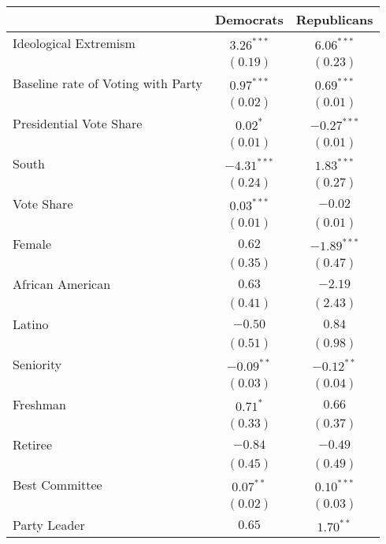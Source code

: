 \documentclass[12pt]{article}
\begin{document}
\begin{table}
	\begin{center}
		\begin{tabular}{l c c }
			\hline
			& Democrats & Republicans \\
			\hline
			Ideological Extremism & $3.26^{***}$  & $6.06^{***}$  \\
			& $(0.19)$      & $(0.23)$      \\
			Baseline rate of Voting with Party              & $0.97^{***}$  & $0.69^{***}$  \\
			& $(0.02)$      & $(0.01)$      \\
			Presidential Vote Share                  & $0.02^{*}$    & $-0.27^{***}$ \\
			& $(0.01)$      & $(0.01)$      \\
			South                     & $-4.31^{***}$ & $1.83^{***}$  \\
			& $(0.24)$      & $(0.27)$      \\
			Vote Share                   & $0.03^{***}$  & $-0.02$       \\
			& $(0.01)$      & $(0.01)$      \\
			Female                    & $0.62$        & $-1.89^{***}$ \\
			& $(0.35)$      & $(0.47)$      \\
			African American                      & $0.63$        & $-2.19$       \\
			& $(0.41)$      & $(2.43)$      \\
			Latino                    & $-0.50$       & $0.84$        \\
			& $(0.51)$      & $(0.98)$      \\
			Seniority                 & $-0.09^{**}$  & $-0.12^{**}$  \\
			& $(0.03)$      & $(0.04)$      \\
			Freshman                  & $0.71^{*}$    & $0.66$        \\
			& $(0.33)$      & $(0.37)$      \\
			Retiree                     & $-0.84$       & $-0.49$       \\
			& $(0.45)$      & $(0.49)$      \\
			Best Committee               & $0.07^{**}$   & $0.10^{***}$  \\
			& $(0.02)$      & $(0.03)$      \\
			Party Leader                    & $0.65$        & $1.70^{**}$   \\

\end{tabular}
\end{center}
\end{table}
\end{document}
